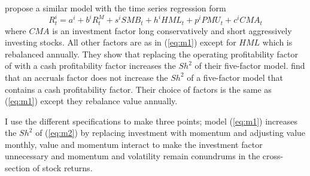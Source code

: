 \textcite{fama2016choosing} propose a similar model with the time series regression form
\begin{equation}
\label{eq:m2}
R_t^i=a^i+b^iR_t^M+s^iSMB_t+h^iHML_t+p^iPMU_t+c^iCMA_t
\end{equation}
where $CMA$ is an investment factor long conservatively and short aggressively investing
stocks. All other factors are as in (\ref{eq:m1}) except for $HML$ which is rebalanced
annually. They show that replacing the operating profitability factor of
\textcite{fama2015five} with a cash profitability factor increases the $Sh^2$ of their
five-factor model. \textcite{ball2016accruals} find that an accruals factor does not
increase the $Sh^2$ of a five-factor model that contains a cash profitability factor.
Their choice of factors is the same as (\ref{eq:m1}) except they rebalance value annually.

I use the different specifications to make three points; model (\ref{eq:m1}) increases the
$Sh^2$ of (\ref{eq:m2}) by replacing investment with momentum and adjusting value monthly,
value and momentum interact to make the investment factor unnecessary and momentum and
volatility remain conundrums in the cross-section of stock returns.
